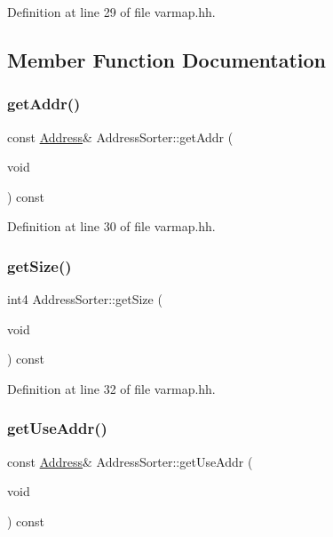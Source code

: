 Definition at line 29 of file varmap.\+hh.



\subsection{Member Function Documentation}
\mbox{\label{class_address_sorter_aead65776190c5c566f80727b2dfa144f}} 
\subsubsection{\texorpdfstring{getAddr()}{getAddr()}}
{\footnotesize\ttfamily const \mbox{\hyperlink{class_address}{Address}}\& Address\+Sorter\+::get\+Addr (\begin{DoxyParamCaption}\item[{void}]{ }\end{DoxyParamCaption}) const\hspace{0.3cm}{\ttfamily [inline]}}



Definition at line 30 of file varmap.\+hh.

\mbox{\label{class_address_sorter_a8637f098fe6b89ba4750bb6f70b57f9a}} 
\subsubsection{\texorpdfstring{getSize()}{getSize()}}
{\footnotesize\ttfamily int4 Address\+Sorter\+::get\+Size (\begin{DoxyParamCaption}\item[{void}]{ }\end{DoxyParamCaption}) const\hspace{0.3cm}{\ttfamily [inline]}}



Definition at line 32 of file varmap.\+hh.

\mbox{\label{class_address_sorter_a9d10f94b4b86407b2e269be85c36a7ea}} 
\subsubsection{\texorpdfstring{getUseAddr()}{getUseAddr()}}
{\footnotesize\ttfamily const \mbox{\hyperlink{class_address}{Address}}\& Address\+Sorter\+::get\+Use\+Addr (\begin{DoxyParamCaption}\item[{void}]{ }\end{DoxyParamCaption}) const\hspace{0.3cm}{\ttfamily [inline]}}



